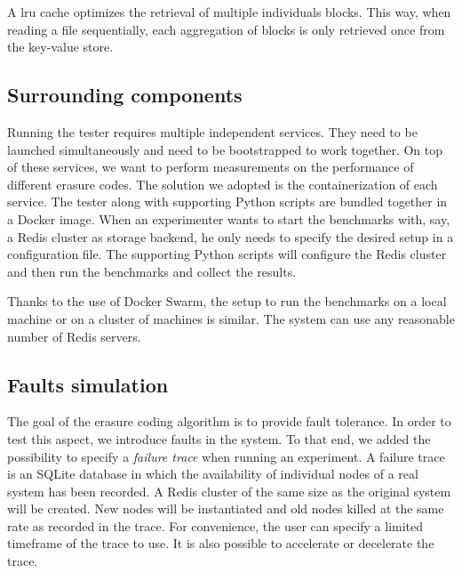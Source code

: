 A \ac{lru} cache optimizes the retrieval of multiple individuals blocks.
This way, when reading a file sequentially, each aggregation of blocks is only retrieved once from the key-value store.

\subsection{Surrounding components}

Running the tester requires multiple independent services.
They need to be launched simultaneously and need to be bootstrapped to work together.
On top of these services, we want to perform measurements on the performance of different erasure codes.
The solution we adopted is the containerization of each service.
The tester along with supporting Python scripts are bundled together in a Docker image.
When an experimenter wants to start the benchmarks with, say, a Redis cluster as storage backend, he only needs to specify the desired setup in a configuration file.
The supporting Python scripts will configure the Redis cluster and then run the benchmarks and collect the results.

Thanks to the use of Docker Swarm, the setup to run the benchmarks on a local machine or on a cluster of machines is similar.
The system can use any reasonable number of Redis servers.

\subsection{Faults simulation}

The goal of the erasure coding algorithm is to provide fault tolerance.
In order to test this aspect, we introduce faults in the system. To that end, we added the possibility to specify a \textit{failure trace} when running an experiment.
A failure trace is an SQLite database in which the availability of individual nodes of a real system has been recorded.
A Redis cluster of the same size as the original system will be created.
New nodes will be instantiated and old nodes killed at the same rate as recorded in the trace.
For convenience, the user can specify a limited timeframe of the trace to use.
It is also possible to accelerate or decelerate the trace.
